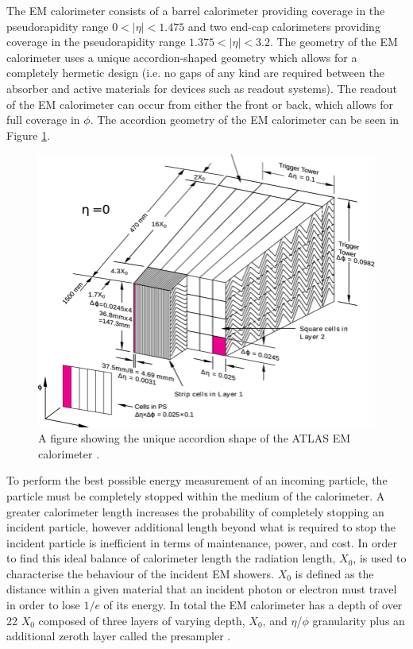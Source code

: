 \documentclass[12pt,a4paper,epsf,portrait,times,epsfig]{article}
\begin{document}
		The EM calorimeter consists of a barrel calorimeter providing coverage in the pseudorapidity range $0 < |\eta| < 1.475$ and two end-cap calorimeters providing coverage in the pseudorapidity range $1.375 < |\eta| < 3.2$. The geometry of the EM calorimeter uses a unique accordion-shaped geometry which allows for a completely hermetic design (i.e. no gaps of any kind are required between the absorber and active materials for devices such as readout systems). The readout of the EM calorimeter can occur from either the front or back, which allows for full coverage in $\phi$. The accordion geometry of the EM calorimeter can be seen in Figure \ref{Fig:ATLASECalAccordion}. 

		\begin{figure}
			\centering
			\includegraphics[scale=0.4]{ATLAS_EMCal_Accordion}
			\caption{A figure showing the unique accordion shape of the ATLAS EM calorimeter \cite{ATLASECalAccordionImage}.}
			\label{Fig:ATLASECalAccordion}
		\end{figure}

		To perform the best possible energy measurement of an incoming particle, the particle must be completely stopped within the medium of the calorimeter. A greater calorimeter length increases the probability of completely stopping an incident particle, however additional length beyond what is required to stop the incident particle is inefficient in terms of maintenance, power, and cost. In order to find this ideal balance of calorimeter length the radiation length, $X_{0}$, is used to characterise the behaviour of the incident EM showers. $X_{0}$ is defined as the distance within a given material that an incident photon or electron must travel in order to lose $1/e$ of its energy.  In total the EM calorimeter has a depth of over 22 $X_{0}$ composed of three layers of varying depth, $X_{0}$, and $\eta$/$\phi$ granularity plus an additional zeroth layer called the presampler \cite{ATLASECalAccordionImage}. \par
\end{document}
